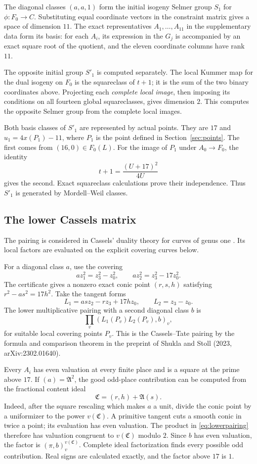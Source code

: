\documentclass[11pt,a4paper]{article}
\theoremstyle{definition}\newtheorem{definition}[theorem]{Definition}
\theoremstyle{remark}\newtheorem{remark}[theorem]{Remark}
\begin{document}
The diagonal classes $(a,a,1)$ form the initial isogeny Selmer group
$S_1$ for $\phi:F_0\to C$. Substituting equal coordinate vectors in
the constraint matrix gives a space of dimension $11$. The exact
representatives $A_1,\ldots,A_{11}$ in the supplementary data form its basis:
for each $A_i$, its expression in the $G_j$ is accompanied by an exact
square root of the quotient, and the eleven coordinate columns have
rank $11$.

The opposite initial group $S'_1$ is computed separately. The local
Kummer map for the dual isogeny on $F_0$ is the squareclass of $t+1$;
it is the sum of the two binary coordinates above. Projecting each
\emph{complete local image}, then imposing its conditions on all
fourteen global squareclasses, gives dimension $2$. This computes the opposite Selmer group from the complete local images.

Both basis classes of $S'_1$ are represented by actual points. They are
$17$ and $u_1=4x(P_1)-11$, where $P_1$ is the point defined in
Section~\ref{sec:points}. The first comes from $(16,0)\in F_0(L)$.
For the image of $P_1$ under $A_0\to F_0$, the identity
\[
t+1=\frac{(U+17)^2}{4U}
\]
gives the second. Exact squareclass calculations prove their independence. Thus $S'_1$ is generated by Mordell--Weil classes.

\subsection{The lower Cassels matrix}

The pairing is considered in Cassels' duality theory for curves of genus one \cite{CasselsIV}. Its local factors are evaluated on the explicit covering curves below.

For a diagonal class $a$, use the covering
\[
a z_1^2=z_3^2-z_0^2,\qquad
a z_2^2=z_3^2-17z_0^2.
\]
The certificate gives a nonzero exact conic point $(r,s,h)$ satisfying
$r^2-a s^2=17h^2$. Take the tangent forms
\[
L_1=as z_2-rz_3+17h z_0,\qquad L_2=z_3-z_0.
\]
The lower multiplicative pairing with a second diagonal class $b$ is
\begin{equation}\label{eq:lowerpairing}
\prod_v(L_1(P_v)L_2(P_v),b)_v,
\end{equation}
for suitable local covering points $P_v$. This is the Cassels--Tate
pairing by the formula and comparison theorem in the preprint of Shukla and Stoll (2023, arXiv:2302.01640).

Every $A_i$ has even valuation at every finite place and is a square
at the prime above $17$. If $(a)=\mathfrak A^2$, the good odd-place
contribution can be computed from the fractional content ideal
\[
\mathfrak C=(r,h)+\mathfrak A(s).
\]
Indeed, after the square rescaling which makes $a$ a unit, divide the
conic point by a uniformizer to the power $v(\mathfrak C)$.
A primitive tangent cuts a smooth conic in twice a point; its evaluation
has even valuation. The product in \eqref{eq:lowerpairing} therefore has
valuation congruent to $v(\mathfrak C)$ modulo $2$. Since $b$ has even
valuation, the factor is
$(\pi,b)_v^{v(\mathfrak C)}$. Complete ideal factorization finds every
possible odd contribution. Real signs are calculated exactly, and the
factor above $17$ is $1$.
\end{document}
